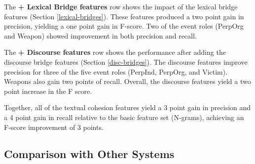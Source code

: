 The {\bf + Lexical Bridge features} row shows 
the impact of the lexical bridge features (Section
\ref{lexical-bridges}).  These features
produced a two point gain in precision, yielding a one
point gain in F-score. Two of the event roles (PerpOrg and  Weapon) showed 
improvement in both precision and recall. 

The {\bf + Discourse features} row shows the performance 
after adding the discourse bridge features (Section \ref{disc-bridges}).  
The discourse features improve precision for three of the five
event roles (PerpInd, PerpOrg, and Victim). 
Weapons also gain two points of recall. Overall, the discourse
features yield a two point increase in the F score.

Together, all of the textual cohesion features yield a 3 point gain in
precision and a 4 point gain in recall relative to the basic feature
set (N-grams), achieving an F-score improvement of 3 points.


\subsection{Comparison with Other Systems}

